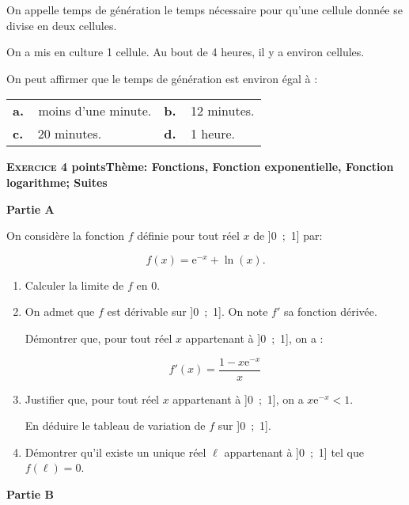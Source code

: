 \documentclass[11pt,a4paper,french]{article}
\begin{document}
\begin{enumerate}
On appelle temps de génération le temps nécessaire pour qu'une cellule donnée se divise en deux cellules.

On a mis en culture 1 cellule. Au bout de 4 heures, il y a environ  cellules.

On peut affirmer que le temps de génération est environ égal à :

\begin{center}
\begin{tabularx}{\linewidth}{*{2}{X}}
\textbf{a.~~}moins d'une minute.&\textbf{b.~~}12 minutes.\\
\textbf{c.~~}20 minutes.		&\textbf{d.~~}1 heure.
\end{tabularx}
\end{center}

\end{enumerate}

\bigskip

\textbf{\textsc{Exercice 4}  points\hfill Thème: Fonctions, Fonction exponentielle, Fonction logarithme; Suites}

\medskip

\textbf{Partie A}

\medskip

On considère la fonction $f$ définie pour tout réel $x$ de ]0~;~1] par:

\[f(x) = \text{e}^{-x} + \ln (x).\]

\smallskip

\begin{enumerate}
\item Calculer la limite de $f$ en $0$.
\item On admet que $f$ est dérivable sur ]0~;~1]. On note $f'$ sa fonction dérivée.

Démontrer que, pour tout réel $x$ appartenant à ]0~;~1], on a :

\[f'(x) = \dfrac{1 - x\text{e}^{-x}}{x}\]

\item Justifier que, pour tout réel $x$ appartenant à ]0~;~1], on a $x\text{e}^{-x} < 1$.

En déduire le tableau de variation de $f$ sur ]0~;~1].
\item Démontrer qu'il existe un unique réel $\ell$ appartenant à ]0~;~1] tel que $f(\ell) = 0$.
\end{enumerate}

\medskip

\textbf{Partie B}

\medskip
\end{document}
